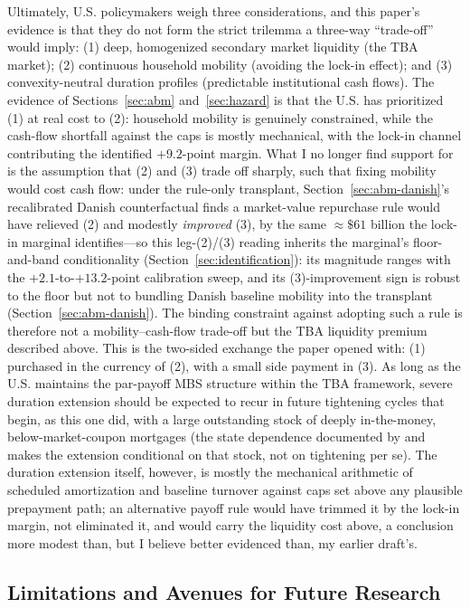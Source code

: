 \documentclass[12pt]{article}
\begin{document}
Ultimately, U.S. policymakers weigh three considerations, and this paper's evidence is that they do not form the strict trilemma a three-way ``trade-off'' would imply: (1) deep, homogenized secondary market liquidity (the TBA market); (2) continuous household mobility (avoiding the lock-in effect); and (3) convexity-neutral duration profiles (predictable institutional cash flows). The evidence of Sections~\ref{sec:abm} and~\ref{sec:hazard} is that the U.S. has prioritized (1) at real cost to (2): household mobility is genuinely constrained, while the cash-flow shortfall against the caps is mostly mechanical, with the lock-in channel contributing the identified $+9.2$-point margin. What I no longer find support for is the assumption that (2) and (3) trade off sharply, such that fixing mobility would cost cash flow: under the rule-only transplant, Section~\ref{sec:abm-danish}'s recalibrated Danish counterfactual finds a market-value repurchase rule would have relieved (2) and modestly \emph{improved} (3), by the same $\approx\$61$ billion the lock-in marginal identifies---so this leg-(2)/(3) reading inherits the marginal's floor-and-band conditionality (Section~\ref{sec:identification}): its magnitude ranges with the $+2.1$-to-$+13.2$-point calibration sweep, and its (3)-improvement sign is robust to the floor but not to bundling Danish baseline mobility into the transplant (Section~\ref{sec:abm-danish}). The binding constraint against adopting such a rule is therefore not a mobility--cash-flow trade-off but the TBA liquidity premium described above. This is the two-sided exchange the paper opened with: (1) purchased in the currency of (2), with a small side payment in (3). As long as the U.S. maintains the par-payoff MBS structure within the TBA framework, severe duration extension should be expected to recur in future tightening cycles that begin, as this one did, with a large outstanding stock of deeply in-the-money, below-market-coupon mortgages (the state dependence documented by \citet{berger2021} and \citet{eichenbaum2022} makes the extension conditional on that stock, not on tightening per se). The duration extension itself, however, is mostly the mechanical arithmetic of scheduled amortization and baseline turnover against caps set above any plausible prepayment path; an alternative payoff rule would have trimmed it by the lock-in margin, not eliminated it, and would carry the liquidity cost above, a conclusion more modest than, but I believe better evidenced than, my earlier draft's.

\subsection{Limitations and Avenues for Future Research}\label{sec:limitations}
\end{document}
